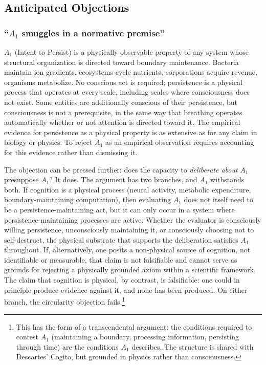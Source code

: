 \documentclass[11pt]{article}
\theoremstyle{plain}
\theoremstyle{definition}
\theoremstyle{remark}
\newcounter{none}
\let\origsubsection\subsection
\renewcommand{\subsection}{\needspace{7\baselineskip}\origsubsection}
\let\origsubsubsection\subsubsection
\renewcommand{\subsubsection}{\needspace{4\baselineskip}\origsubsubsection}
\begin{document}
\subsection{Anticipated Objections}\label{anticipated-objections}

\subsubsection{\texorpdfstring{``\(A_1\) smuggles in a normative
premise''}{``A\_1 smuggles in a normative premise''}}\label{a_1-smuggles-in-a-normative-premise}

\(A_1\) (Intent to Persist) is a physically observable property of any
system whose structural organization is directed toward boundary
maintenance. Bacteria maintain ion gradients, ecosystems cycle
nutrients, corporations acquire revenue, organisms metabolize. No
conscious act is required; persistence is a physical process that
operates at every scale, including scales where consciousness does not
exist. Some entities are additionally conscious of their persistence,
but consciousness is not a prerequisite, in the same way that breathing
operates automatically whether or not attention is directed toward it.
The empirical evidence for persistence as a physical property is as
extensive as for any claim in biology or physics. To reject \(A_1\) as
an empirical observation requires accounting for this evidence rather
than dismissing it.

The objection can be pressed further: does the capacity to
\emph{deliberate about} \(A_1\) presuppose \(A_1\)? It does. The
argument has two branches, and \(A_1\) withstands both. If cognition is
a physical process (neural activity, metabolic expenditure,
boundary-maintaining computation), then evaluating \(A_1\) does not
itself need to be a persistence-maintaining act, but it can only occur
in a system where persistence-maintaining processes are active. Whether
the evaluator is consciously willing persistence, unconsciously
maintaining it, or consciously choosing not to self-destruct, the
physical substrate that supports the deliberation satisfies \(A_1\)
throughout. If, alternatively, one posits a non-physical source of
cognition, not identifiable or measurable, that claim is not falsifiable
and cannot serve as grounds for rejecting a physically grounded axiom
within a scientific framework. The claim that cognition is physical, by
contrast, is falsifiable: one could in principle produce evidence
against it, and none has been produced. On either branch, the
circularity objection fails.\footnote{This has the form of a
  transcendental argument: the conditions required to contest \(A_1\)
  (maintaining a boundary, processing information, persisting through
  time) are the conditions \(A_1\) describes. The structure is shared
  with Descartes' Cogito, but grounded in physics rather than
  consciousness.}
\end{document}
